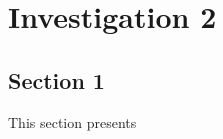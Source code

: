 \chapter{Investigation 2}	
\label{chapter4}

\section{Section 1}

\begin{paragraph}
This section presents
\end{paragraph}
